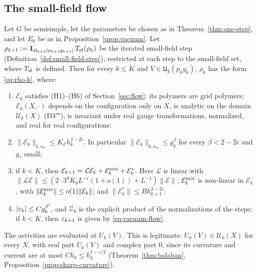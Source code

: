 \subsection{The small-field flow}\label{subsec:tf-flow}

\begin{theorem}\label{thm:sf-flow}
Let $G$ be semisimple, let the parameters be chosen as in Theorem~\ref{thm:one-step}, and let $E_0$ be as in Proposition~\ref{prop:vacuum}. Let $\rho_{k+1}:=\mathbf 1_{\mathfrak U_{k+1}(p_{k+1}g_{k+1})}\,T_{\rm sf}(\rho_k)$ be the iterated small-field step (Definition~\ref{def:small-field-step}), restricted at each step to the small-field set, where $T_{\rm sf}$ is defined. Then for every $k\le K$ and $V\in\mathfrak U_k(p_kg_k)$, $\rho_k$ has the form \eqref{eq:rho-k}, where:
\begin{enumerate}[label=(\roman*)]
\item $\mathcal E_k$ satisfies (H1)--(H6) of Section~\ref{sec:flow}: its polymers are grid polymers; $\mathcal E_k(X,\cdot)$ depends on the configuration only on $X$, is analytic on the domain $\mathcal U_k(X)$ (D3$'''$), is invariant under real gauge transformations, normalized, and real for real configurations;
\item $\|\mathcal E_k\|_{k,\kappa_n}\le K_{\mathcal E}h_k^{2-2\epsilon}$. In particular $\|\mathcal E_k\|_{k,\kappa_n}\le g_k^\beta$ for every $\beta<2-2\epsilon$ and $g_*$ small;
\item if $k<K$, then $\mathcal E_{k+1}=\mathcal L\mathcal E_k+\mathcal E^{\rm mix}_k+\mathcal E^*_k$. Here $\mathcal L$ is linear with $\|\mathcal L\mathcal E\|\le(2\cdot3^dK_0L^{-\epsilon}(1+o(1))+L^{-1})\|\mathcal E\|$; $\mathcal E^{\rm mix}_k$ is non-linear in $\mathcal E_k$, with $\|\mathcal E^{\rm mix}_k\|\le o(1)\|\mathcal E_k\|$; and $\|\mathcal E^*_k\|\le Bh_{k+1}^{2-2\epsilon}$;
\item $|\varepsilon_k|\le Cg_k^{\beta'}$, and $\mathcal Z_k$ is the explicit product of the normalizations of the steps; if $k<K$, then $\varepsilon_{k+1}$ is given by \eqref{eq:vacuum-flow}.
\end{enumerate}
The activities are evaluated at $U_k(V)$. This is legitimate: $U_k(V)\in\mathcal U_k(X)$ for every $X$, with real part $U_k(V)$ and complex part $0$, since its curvature and current are at most $Ch_k\le h_k^{1-\epsilon/2}$ (Theorem~\ref{thm:balaban}, Proposition~\ref{prop:sharp-curvature}).
\end{theorem}

